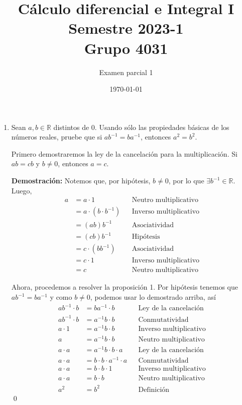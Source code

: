 \documentclass[11pt]{article}
\newcommand{\R}{\mathbb{R}}
\begin{document}
\title{\vspace{-2cm}Cálculo diferencial e Integral I \\ Semestre 2023-1 \\ Grupo 4031}
\author{Examen parcial 1 \\ }
\date{\today}
\maketitle
\thispagestyle{empty}

\begin{enumerate}
 \item Sean $a,b\in \R$ distintos de $0$. Usando sólo las propiedades básicas de los números reales, pruebe que si $ab^{-1}=ba^{-1}$, entonces $a^2=b^2$.
 
 Primero demostraremos la ley de la cancelación para la multiplicación. Si $ab=cb$ y $b\neq 0$, entonces $a=c$.
 
 \textbf{Demostración:} Notemos que, por hipótesis, $b\neq 0$, por lo que $\exists b^{-1}\in \R$. Luego, \begin{align*}
  a &= a \cdot 1 && \text{Neutro multiplicativo}\\
  &= a \cdot (b\cdot b^{-1}) && \text{Inverso multiplicativo}\\
  &= (ab) b^{-1} && \text{Asociatividad}\\
  &= (cb) b^{-1} && \text{Hipótesis	}\\
  &= c\cdot (bb^{-1}) && \text{Asociatividad}\\
  &= c \cdot 1 && \text{Inverso multiplicativo}\\
  &= c && \text{Neutro multiplicativo}
 \end{align*}

Ahora, procedemos a resolver la proposición 1. Por hipótesis tenemos que $ab^{-1}=ba^{-1}$ y como $b\neq 0$, podemos usar lo demostrado arriba, así \begin{align*}
 ab^{-1} \cdot b &= ba^{-1} \cdot b && \text{Ley de la cancelación}\\
 ab^{-1} \cdot b &= a^{-1} b \cdot b && \text{Conmutatividad}\\
 a \cdot 1 &= a^{-1} b \cdot b && \text{Inverso multiplicativo}\\
 a &= a^{-1} b \cdot b && \text{Neutro multiplicativo}\\
 a \cdot a &= a^{-1} b \cdot b \cdot a && \text{Ley de la cancelación}\\
 a \cdot a &= b \cdot b \cdot a^{-1} \cdot a && \text{Conmutatividad}\\
 a \cdot a &= b \cdot b \cdot 1 && \text{Inverso multiplicativo}\\
 a \cdot a &= b \cdot b && \text{Neutro multiplicativo}\\
 a^2 &= b^2 && \text{Definición}
\end{align*} \qed


\end{enumerate}
\end{document}
